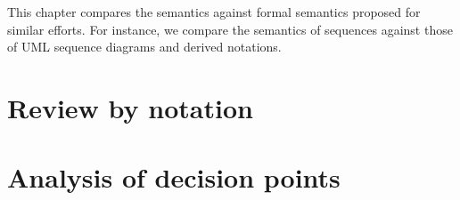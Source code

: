 This chapter compares the \langname{} semantics against formal semantics
proposed for similar efforts.  For instance, we compare the semantics of
sequences against those of UML sequence diagrams and derived notations.

\section{Review by notation}\label{sec:semantics-comparison-review}


\section{Analysis of decision points}\label{sec:semantics-comparison-review}
